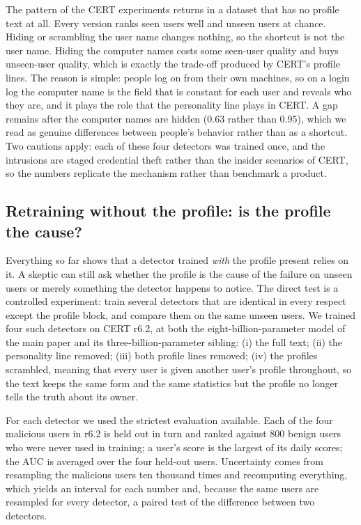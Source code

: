 \documentclass[10pt]{article}
\begin{document}
The pattern of the CERT experiments returns in a dataset that has no
profile text at all. Every version ranks seen users well and unseen users
at chance. Hiding or scrambling the user name changes nothing, so the
shortcut is not the user name. Hiding the computer names costs some
seen-user quality and buys unseen-user quality, which is exactly the
trade-off produced by CERT's profile lines. The reason is simple: people
log on from their own machines, so on a login log the computer name is
the field that is constant for each user and reveals who they are, and it
plays the role that the personality line plays in CERT. A gap remains
after the computer names are hidden ($0.63$ rather than $0.95$), which we
read as genuine differences between people's behavior rather than as a
shortcut. Two cautions apply: each of these four detectors was trained
once, and the intrusions are staged credential theft rather than the
insider scenarios of CERT, so the numbers replicate the mechanism rather
than benchmark a product.

\subsection{Retraining without the profile: is the profile the cause?}
\label{sec:plain-factorial}

Everything so far shows that a detector trained \emph{with} the profile
present relies on it. A skeptic can still ask whether the profile is the
cause of the failure on unseen users or merely something the detector
happens to notice. The direct test is a controlled experiment: train
several detectors that are identical in every respect except the profile
block, and compare them on the same unseen users. We trained four such
detectors on CERT r6.2, at both the eight-billion-parameter model of the
main paper and its three-billion-parameter sibling: (i) the full text;
(ii) the personality line removed; (iii) both profile lines removed;
(iv) the profiles scrambled, meaning that every user is given another
user's profile throughout, so the text keeps the same form and the same
statistics but the profile no longer tells the truth about its owner.

For each detector we used the strictest evaluation available. Each of the
four malicious users in r6.2 is held out in turn and ranked against $800$
benign users who were never used in training; a user's score is the
largest of its daily scores; the AUC is averaged over the four held-out
users. Uncertainty comes from resampling the malicious users ten thousand
times and recomputing everything, which yields an interval for each
number and, because the same users are resampled for every detector, a
paired test of the difference between two detectors.
\end{document}
